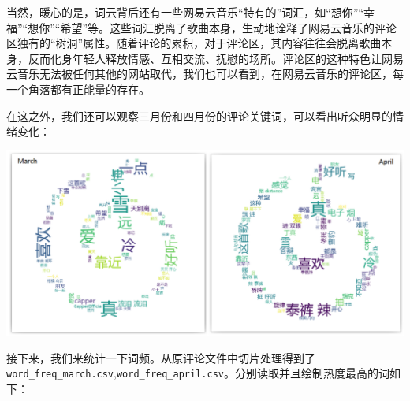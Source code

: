 \documentclass[
]{article}
\begin{document}
当然，暖心的是，词云背后还有一些网易云音乐``特有的''词汇，如``想你''``幸福''``想你''``希望''等。这些词汇脱离了歌曲本身，生动地诠释了网易云音乐的评论区独有的``树洞''属性。随着评论的累积，对于评论区，其内容往往会脱离歌曲本身，反而化身年轻人释放情感、互相交流、抚慰的场所。评论区的这种特色让网易云音乐无法被任何其他的网站取代，我们也可以看到，在网易云音乐的评论区，每一个角落都有正能量的存在。

在这之外，我们还可以观察三月份和四月份的评论关键词，可以看出听众明显的情绪变化：

\begin{center}\includegraphics[width=1\linewidth,height=1\textheight]{img/2} \end{center}

接下来，我们来统计一下词频。从原评论文件中切片处理得到了\texttt{word\_freq\_march.csv},\texttt{word\_freq\_april.csv}。分别读取并且绘制热度最高的词如下：
\end{document}

